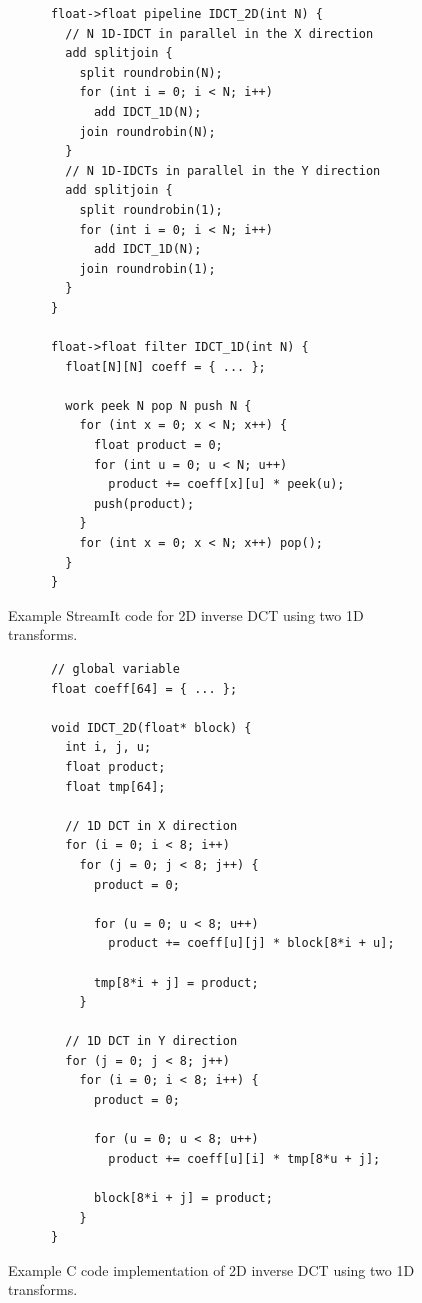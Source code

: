 \begin{figure}[t]
  \begin{scriptsize}
    \begin{verbatim}
      float->float pipeline IDCT_2D(int N) {
        // N 1D-IDCT in parallel in the X direction
        add splitjoin {
          split roundrobin(N);
          for (int i = 0; i < N; i++)
            add IDCT_1D(N);
          join roundrobin(N);
        }
        // N 1D-IDCTs in parallel in the Y direction
        add splitjoin {
          split roundrobin(1);
          for (int i = 0; i < N; i++)
            add IDCT_1D(N);
          join roundrobin(1);
        }
      }

      float->float filter IDCT_1D(int N) {
        float[N][N] coeff = { ... };
        
        work peek N pop N push N {
          for (int x = 0; x < N; x++) {
            float product = 0;
            for (int u = 0; u < N; u++)
              product += coeff[x][u] * peek(u);
            push(product);
          }
          for (int x = 0; x < N; x++) pop();
        }
      }
    \end{verbatim}
  \end{scriptsize}
  \vspace{-17pt}
  \caption{Example StreamIt code for 2D inverse DCT using two 1D transforms.}
  \vspace{-20pt}
  \label{fig:decoder-sj}
\end{figure}
\begin{figure}[t]
  \begin{scriptsize}
    \begin{verbatim}
      // global variable
      float coeff[64] = { ... };
      
      void IDCT_2D(float* block) {
        int i, j, u;
        float product;
        float tmp[64];
        
        // 1D DCT in X direction
        for (i = 0; i < 8; i++)
          for (j = 0; j < 8; j++) {
            product = 0;

            for (u = 0; u < 8; u++)
              product += coeff[u][j] * block[8*i + u];

            tmp[8*i + j] = product;
          }

        // 1D DCT in Y direction
        for (j = 0; j < 8; j++)
          for (i = 0; i < 8; i++) {
            product = 0;

            for (u = 0; u < 8; u++)
              product += coeff[u][i] * tmp[8*u + j];

            block[8*i + j] = product;
          }
      }
    \end{verbatim}
  \end{scriptsize}
  \vspace{-17pt}
  \caption{Example C code implementation of 2D inverse DCT using two 1D transforms.}
  \vspace{-20pt}
  \label{fig:idct_creference}
\end{figure}

